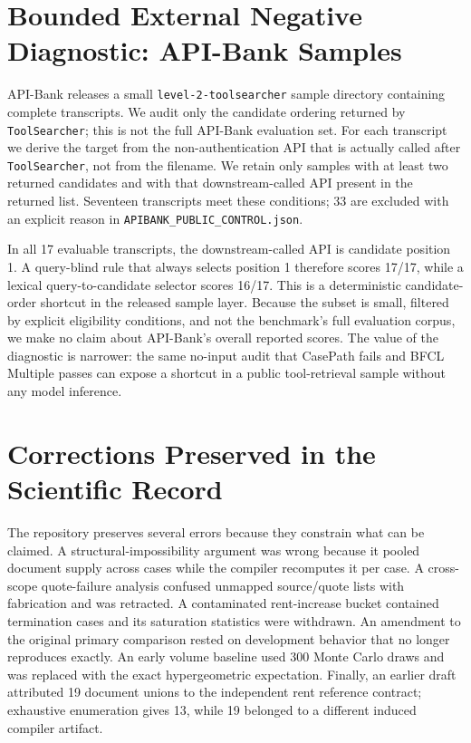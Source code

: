 \documentclass{article}
\begin{document}
\section{Bounded External Negative Diagnostic: API-Bank Samples}
\label{app:apibank}
API-Bank \citep{li2023apibank} releases a small \texttt{level-2-toolsearcher} sample directory containing complete transcripts. We audit only the candidate ordering returned by \texttt{ToolSearcher}; this is not the full API-Bank evaluation set. For each transcript we derive the target from the non-authentication API that is actually called after \texttt{ToolSearcher}, not from the filename. We retain only samples with at least two returned candidates and with that downstream-called API present in the returned list. Seventeen transcripts meet these conditions; 33 are excluded with an explicit reason in \texttt{APIBANK\_PUBLIC\_CONTROL.json}.

In all 17 evaluable transcripts, the downstream-called API is candidate position 1. A query-blind rule that always selects position 1 therefore scores 17/17, while a lexical query-to-candidate selector scores 16/17. This is a deterministic candidate-order shortcut in the released sample layer. Because the subset is small, filtered by explicit eligibility conditions, and not the benchmark's full evaluation corpus, we make no claim about API-Bank's overall reported scores. The value of the diagnostic is narrower: the same no-input audit that CasePath fails and BFCL Multiple passes can expose a shortcut in a public tool-retrieval sample without any model inference.

\section{Corrections Preserved in the Scientific Record}
The repository preserves several errors because they constrain what can be claimed. A structural-impossibility argument was wrong because it pooled document supply across cases while the compiler recomputes it per case. A cross-scope quote-failure analysis confused unmapped source/quote lists with fabrication and was retracted. A contaminated rent-increase bucket contained termination cases and its saturation statistics were withdrawn. An amendment to the original primary comparison rested on development behavior that no longer reproduces exactly. An early volume baseline used 300 Monte Carlo draws and was replaced with the exact hypergeometric expectation. Finally, an earlier draft attributed 19 document unions to the independent rent reference contract; exhaustive enumeration gives 13, while 19 belonged to a different induced compiler artifact.
\end{document}
